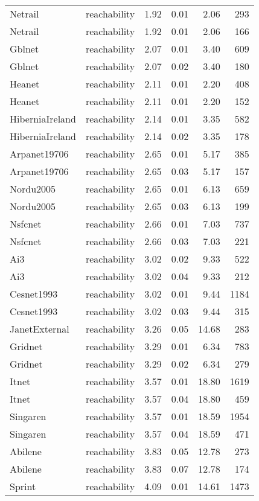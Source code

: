 \begin{tabular}{llrrrr}
Netrail & reachability & 1.92 & 0.01 & 2.06 & 293 \\
Netrail & reachability & 1.92 & 0.01 & 2.06 & 166 \\
Gblnet & reachability & 2.07 & 0.01 & 3.40 & 609 \\
Gblnet & reachability & 2.07 & 0.02 & 3.40 & 180 \\
Heanet & reachability & 2.11 & 0.01 & 2.20 & 408 \\
Heanet & reachability & 2.11 & 0.01 & 2.20 & 152 \\
HiberniaIreland & reachability & 2.14 & 0.01 & 3.35 & 582 \\
HiberniaIreland & reachability & 2.14 & 0.02 & 3.35 & 178 \\
Arpanet19706 & reachability & 2.65 & 0.01 & 5.17 & 385 \\
Arpanet19706 & reachability & 2.65 & 0.03 & 5.17 & 157 \\
Nordu2005 & reachability & 2.65 & 0.01 & 6.13 & 659 \\
Nordu2005 & reachability & 2.65 & 0.03 & 6.13 & 199 \\
Nsfcnet & reachability & 2.66 & 0.01 & 7.03 & 737 \\
Nsfcnet & reachability & 2.66 & 0.03 & 7.03 & 221 \\
Ai3 & reachability & 3.02 & 0.02 & 9.33 & 522 \\
Ai3 & reachability & 3.02 & 0.04 & 9.33 & 212 \\
Cesnet1993 & reachability & 3.02 & 0.01 & 9.44 & 1184 \\
Cesnet1993 & reachability & 3.02 & 0.03 & 9.44 & 315 \\
JanetExternal & reachability & 3.26 & 0.05 & 14.68 & 283 \\
Gridnet & reachability & 3.29 & 0.01 & 6.34 & 783 \\
Gridnet & reachability & 3.29 & 0.02 & 6.34 & 279 \\
Itnet & reachability & 3.57 & 0.01 & 18.80 & 1619 \\
Itnet & reachability & 3.57 & 0.04 & 18.80 & 459 \\
Singaren & reachability & 3.57 & 0.01 & 18.59 & 1954 \\
Singaren & reachability & 3.57 & 0.04 & 18.59 & 471 \\
Abilene & reachability & 3.83 & 0.05 & 12.78 & 273 \\
Abilene & reachability & 3.83 & 0.07 & 12.78 & 174 \\
Sprint & reachability & 4.09 & 0.01 & 14.61 & 1473 \\

\end{tabular}
